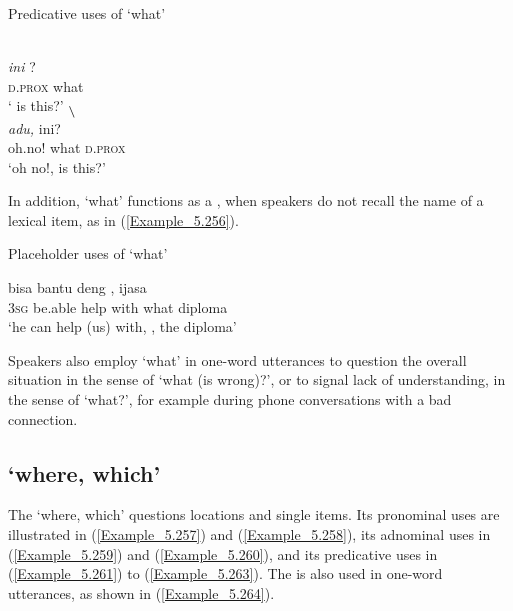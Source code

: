 \begin{styleExampleTitle}
Predicative uses of  ‘what’
\end{styleExampleTitle}

\ea
\label{Example_5.254}
\glll {\textstyleChBold{{} --{\hspace{3pt}}-- }}\hspace{5mm}  {}\\ %
\textit{ini} ?\\
 \textsc{d.prox}  what\\
\glt 
‘ is this?’ \textstyleExampleSource{[081109-001-Cv.0012]}
\z
\ea
\label{Example_5.255}
\glll{\textstyleChBold{{} -- }\textbf{\textsubscript{{\textbackslash}}}}\hspace{5mm} {\textstyleChBold{{} --{\hspace{3pt}}-- }}\hspace{5mm} {\textstyleChBold{{}-- }\textbf{\textsubscript{{\textbackslash}}}}\\ %
\textit{adu,}     ini?\\
 oh.no!  what  \textsc{d.prox}\\
\glt 
‘oh no!,  is this?’ \textstyleExampleSource{[081109-001-Cv.0012]}
\z


In addition,  ‘what’ functions as a , when speakers do not recall the name of a lexical item, as in (\ref{Example_5.256}).


\begin{styleExampleTitle}
Placeholder uses of  ‘what’
\end{styleExampleTitle}

\ea
\label{Example_5.256}
 {bisa} {bantu} {deng} {,} {ijasa}\\ %
 \textsc{3sg}  be.able  help  with  what  diploma\\
\glt 
‘he can help (us) with, , the diploma’ \textstyleExampleSource{[081011-023-Cv.0107]}
\z


Speakers also employ  ‘what’ in one-word utterances to question the overall situation in the sense of ‘what (is wrong)?’, or to signal lack of understanding, in the sense of ‘what?’, for example during phone conversations with a bad connection.


\subsection{ ‘where, which’}
\label{Para_5.8.3}
The   ‘where, which’ questions locations and single items. Its pronominal uses are illustrated in (\ref{Example_5.257}) and (\ref{Example_5.258}), its adnominal uses in (\ref{Example_5.259}) and (\ref{Example_5.260}), and its predicative uses in (\ref{Example_5.261}) to (\ref{Example_5.263}). The  is also used in one-word utterances, as shown in (\ref{Example_5.264}).




